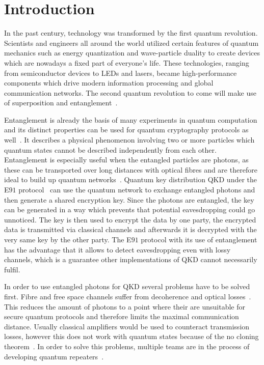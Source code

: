 \chapter{Introduction}

In the past century, technology was transformed by the first quantum revolution. Scientists and engineers all around the world utilized certain features of quantum mechanics such as energy quantization and wave-particle duality to create devices which are nowadays a fixed part of everyone's life.
These technologies, ranging from semiconductor devices to LEDs and lasers, became high-performance components which drive modern information processing and global communication networks.
The second quantum revolution to come will make use of superposition and entanglement~\cite{aharonovich_solid-state_2016}\cite{macfarlane_quantum_2003}.

Entanglement is already the basis of many experiments in quantum computation and its distinct properties can be used for quantum cryptography protocols as well~\cite{zeilinger_light_2017}.
It describes a physical phenomenon involving two or more particles which quantum states cannot be described independently from each other.
Entanglement is especially useful when the entangled particles are photons, as these can be transported over long distances with optical fibres and are therefore ideal to build up quantum networks~\cite{gisin_quantum_2002}.
Quantum key distribution \acs{QKD}  under the E$91$ protocol~\cite{ekert_quantum_1991} can use the quantum network to exchange entangled photons and then generate a shared encryption key.
Since the photons are entangled, the key can be generated in a way which prevents that potential eavesdropping could go unnoticed.
The key is then used to encrypt the data by one party, the encrypted data is transmitted via classical channels and afterwards it is decrypted with the very same key by the other party.
The E$91$ protocol with its use of entanglement has the advantage that it allows to detect eavesdropping even with lossy channels, which is a guarantee other implementations of \ac{QKD} cannot necessarily fulfil.

In order to use entangled photons for \ac{QKD} several problems have to be solved first.
Fibre and free space channels suffer from decoherence and optical losses~\cite{sangouard_quantum_2011}.
This reduces the amount of photons to a point where their are unsuitable for secure quantum protocols and therefore limits the maximal communication distance.
Usually classical amplifiers would be used to counteract transmission losses, however this does not work with quantum states because of the no cloning theorem~\cite{park_concept_1970}.
In order to solve this problems, multiple teams are in the process of developing quantum repeaters~\cite{reindl_all-photonic_2018}\cite{duan_long-distance_2001}\cite{simon_quantum_2007}.

